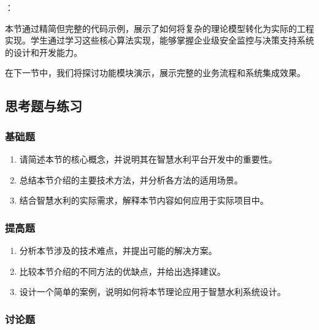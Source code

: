 ：

本节通过精简但完整的代码示例，展示了如何将复杂的理论模型转化为实际的工程实现。学生通过学习这些核心算法实现，能够掌握企业级安全监控与决策支持系统的设计和开发能力。

在下一节中，我们将探讨功能模块演示，展示完整的业务流程和系统集成效果。

\hypertarget{ux601dux8003ux9898ux4e0eux7ec3ux4e60-2}{%
\subsection{思考题与练习}\label{ux601dux8003ux9898ux4e0eux7ec3ux4e60-2}}

\hypertarget{ux57faux7840ux9898-2}{%
\subsubsection{基础题}\label{ux57faux7840ux9898-2}}

\begin{enumerate}
\def\labelenumi{\arabic{enumi}.}
\tightlist
\item
  请简述本节的核心概念，并说明其在智慧水利平台开发中的重要性。
\item
  总结本节介绍的主要技术方法，并分析各方法的适用场景。
\item
  结合智慧水利的实际需求，解释本节内容如何应用于实际项目中。
\end{enumerate}

\hypertarget{ux63d0ux9ad8ux9898-2}{%
\subsubsection{提高题}\label{ux63d0ux9ad8ux9898-2}}

\begin{enumerate}
\def\labelenumi{\arabic{enumi}.}
\tightlist
\item
  分析本节涉及的技术难点，并提出可能的解决方案。
\item
  比较本节介绍的不同方法的优缺点，并给出选择建议。
\item
  设计一个简单的案例，说明如何将本节理论应用于智慧水利系统设计。
\end{enumerate}

\hypertarget{ux8ba8ux8bbaux9898-2}{%
\subsubsection{讨论题}\label{ux8ba8ux8bbaux9898-2}}

